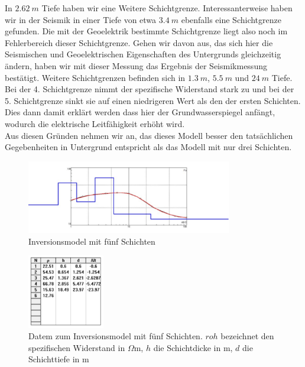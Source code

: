 In $\SI{2,62}{m}$ Tiefe haben wir eine Weitere Schichtgrenze. Interessanterweise haben wir in der Seismik in einer Tiefe von etwa $\SI{3,4 }{m}$ ebenfalls eine Schichtgrenze gefunden. Die mit der Geoelektrik bestimmte Schichtgrenze liegt also noch im Fehlerbereich dieser Schichtgrenze. 
Gehen wir davon aus, das sich hier die Seismischen und Geoelektrischen Eigenschaften des Untergrunds gleichzeitig ändern, haben wir mit dieser Messung das Ergebnis der Seismikmessung bestätigt. 
Weitere Schichtgrenzen befinden sich in $\SI{1,3}{m}$, $\SI{5,5}{m}$ und $\SI{24}{m}$ Tiefe. Bei der 4. Schichtgrenze nimmt der spezifische Widerstand stark zu und bei der 5. Schichtgrenze sinkt sie auf einen niedrigeren Wert als den der ersten Schichten. Dies dann damit erklärt werden dass hier der Grundwasserspiegel anfängt, wodurch die elektrische Leitfähigkeit erhöht wird.\\
Aus diesen Gründen nehmen wir an, das dieses Modell besser den tatsächlichen Gegebenheiten in Untergrund entspricht als das Modell mit nur drei Schichten.


\begin{figure}[h]
\centering
\includegraphics[width=0.8\textwidth]{fig/Schlumberger_5Schichten.pdf}
\caption{Inversionsmodel mit fünf Schichten}
\label{abb:Schlum2}
\end{figure}
\begin{figure}[h]
\centering
\includegraphics[width=0.3\textwidth]{fig/schlumbergerTabelle2.pdf}
\caption{Datem zum Inversionsmodel mit fünf Schichten. $roh$ bezeichnet den spezifischen Widerstand in $\Omega$m, $h$ die Schichtdicke in m, $d$ die Schichttiefe in m}
\label{abb:SchlumTab2}
\end{figure}





